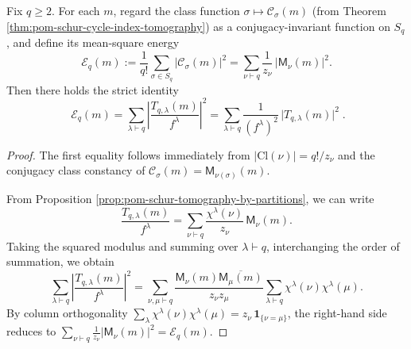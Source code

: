 \begin{theorem}\label{thm:pom-schur-plancherel-energy-identity}
Fix \(q\ge 2\).
For each \(m\), regard the class function \(\sigma\mapsto \mathcal{C}_\sigma(m)\) (from Theorem \ref{thm:pom-schur-cycle-index-tomography}) as a conjugacy-invariant function on \(S_q\), and define its mean-square energy
\[
\mathcal{E}_q(m):=\frac{1}{q!}\sum_{\sigma\in S_q}\bigl|\mathcal{C}_\sigma(m)\bigr|^2
=\sum_{\nu\vdash q}\frac{1}{z_\nu}\,\bigl|\mathsf{M}_\nu(m)\bigr|^2.
\]
Then there holds the strict identity
\[
\boxed{\;
\mathcal{E}_q(m)=\sum_{\lambda\vdash q}\left|\frac{T_{q,\lambda}(m)}{f^\lambda}\right|^2
=\sum_{\lambda\vdash q}\frac{1}{(f^\lambda)^2}\,\bigl|T_{q,\lambda}(m)\bigr|^2\; }.
\]
\end{theorem}
\begin{proof}
The first equality follows immediately from \(|\mathrm{Cl}(\nu)|=q!/z_\nu\) and the conjugacy class constancy of \(\mathcal{C}_\sigma(m)=\mathsf{M}_{\nu(\sigma)}(m)\).
\par
From Proposition \ref{prop:pom-schur-tomography-by-partitions}, we can write
\[
\frac{T_{q,\lambda}(m)}{f^\lambda}
=\sum_{\nu\vdash q}\frac{\chi^\lambda(\nu)}{z_\nu}\,\mathsf{M}_\nu(m).
\]
Taking the squared modulus and summing over \(\lambda\vdash q\), interchanging the order of summation, we obtain
\[
\sum_{\lambda\vdash q}\left|\frac{T_{q,\lambda}(m)}{f^\lambda}\right|^2
=\sum_{\nu,\mu\vdash q}\frac{\mathsf{M}_\nu(m)\overline{\mathsf{M}_\mu(m)}}{z_\nu z_\mu}
\sum_{\lambda\vdash q}\chi^\lambda(\nu)\chi^\lambda(\mu).
\]
By column orthogonality \(\sum_{\lambda}\chi^\lambda(\nu)\chi^\lambda(\mu)=z_\nu\,\mathbf 1_{\{\nu=\mu\}}\), the right-hand side reduces to
\(
\sum_{\nu\vdash q}\frac{1}{z_\nu}|\mathsf{M}_\nu(m)|^2=\mathcal E_q(m)
\).
\end{proof}

